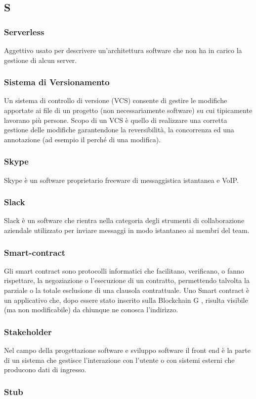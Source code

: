\subsection*{\textbf{\hfill \Huge{S} \hfill}} 
\subsubsection*{Serverless}
Aggettivo usato per descrivere un’architettura software che non ha in carico la gestione di alcun server.
\subsubsection*{Sistema di Versionamento}
Un sistema di controllo di versione (VCS) consente di gestire le modifiche apportate ai file di un progetto (non necessariamente software) su cui tipicamente lavorano più persone. Scopo di un VCS è quello di realizzare una corretta gestione delle modifiche garantendone la reversibilità, la concorrenza ed una annotazione (ad esempio il perché di una modifica).
\subsubsection*{Skype}
Skype è un software proprietario freeware di messaggistica istantanea e VoIP.
\subsubsection*{Slack}
Slack è un software che rientra nella categoria degli strumenti di collaborazione aziendale utilizzato per inviare messaggi in modo istantaneo ai membri del team.
\subsubsection*{Smart-contract}
Gli smart contract sono protocolli informatici che facilitano, verificano, o fanno rispettare, la negoziazione o l’esecuzione di un contratto, permettendo talvolta la parziale o la totale esclusione di una clausola contrattuale. Uno Smart contract è un applicativo che, dopo essere stato inserito sulla Blockchain G , risulta visibile (ma non modificabile) da chiunque ne conosca l’indirizzo.
\subsubsection*{Stakeholder}
Nel campo della progettazione software e sviluppo software il front end è la parte di un sistema che gestisce l’interazione con l’utente o con sistemi esterni che producono dati di ingresso.
\subsubsection*{Stub}

